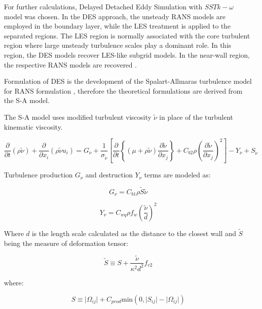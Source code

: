 For further calculations, Delayed Detached Eddy Simulation with $SST k-\omega$ model was chosen. In the DES approach, the unsteady RANS models are employed in the boundary layer, while the LES treatment is applied to the separated regions. The LES region is normally associated with the core turbulent region where large unsteady turbulence scales play a dominant role. In this region, the DES models recover LES-like subgrid models. In the near-wall region, the respective RANS models are recovered \citep{fluenttheory}.

Formulation of DES is the development of the Spalart-Allmaras turbulence model for RANS formulation \citep{desspalart}, therefore the theoretical formulations are derived from the S-A model.

The S-A model uses modified turbulent viscosity $\tilde{\nu}$ in place of the turbulent kinematic viscosity.

\begin{equation} \label{eq:nutilde}
\frac{\partial}{\partial t} \left( \rho \tilde{\nu} \right)
+ \frac{\partial}{\partial x_i} \left( \rho \tilde{\nu} u_i \right)
= G_{\nu} + \frac{1}{\sigma_{\tilde{\nu}}}
\left[
\frac{\partial}{\partial t} \left\lbrace \left( \mu + \rho \tilde{\nu} \right) \frac{\partial \tilde{\nu}}{\partial x_j} \right\rbrace
+ C_{b2} \rho \left( \frac{\partial \tilde{\nu}}{\partial x_{j}}\right)^{2}
\right]
- Y_{\nu} + S_{\tilde{\nu}}
\end{equation}

Turbulence production $G_{\nu}$ and destruction $Y_{\nu}$ terms are modeled as:

\begin{equation} \label{eq:SAGnu}
G_{\nu} = C_{b1} \rho \tilde{S} \tilde{\nu}
\end{equation}

\begin{equation} \label{eq:SAYnu}
Y_{\nu} = C_{wq} \rho f_{w} \left(\frac{\tilde{\nu}}{d} \right)^2
\end{equation}

Where $d$ is the length scale calculated as the distance to the closest wall and $\tilde{S}$ being the measure of deformation tensor:

\begin{equation} \label{eq:SAdeform}
\tilde{S} \equiv S + \frac{\tilde{\nu}}{\kappa^2 d^2} f_{v2}
\end{equation}

\noindent where:

\begin{equation} \label{eq:SAdeform2}
S \equiv \lvert \Omega_{ij} \rvert + C_{prod} \text{min} \left(0, \lvert S_{ij} \rvert - \lvert \Omega_{ij} \rvert \right)
\end{equation}

